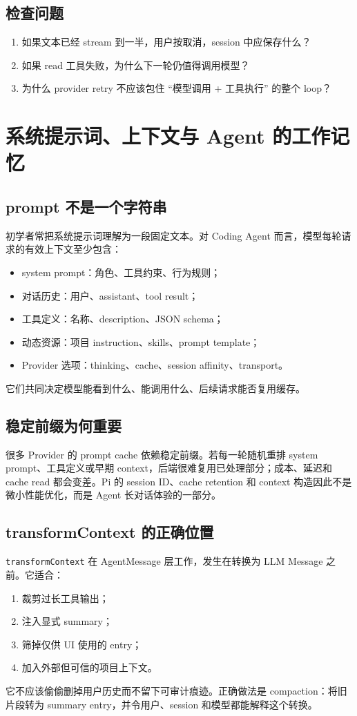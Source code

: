 \documentclass[UTF8,openany,11pt]{ctexbook}
\begin{document}
\section{检查问题}
\begin{enumerate}
\item 如果文本已经 stream 到一半，用户按取消，session 中应保存什么？
\item 如果 read 工具失败，为什么下一轮仍值得调用模型？
\item 为什么 provider retry 不应该包住 ``模型调用 + 工具执行'' 的整个 loop？
\end{enumerate}

\chapter{系统提示词、上下文与 Agent 的工作记忆}

\section{prompt 不是一个字符串}
初学者常把系统提示词理解为一段固定文本。对 Coding Agent 而言，模型每轮请求的有效上下文至少包含：
\begin{itemize}
\item system prompt：角色、工具约束、行为规则；
\item 对话历史：用户、assistant、tool result；
\item 工具定义：名称、description、JSON schema；
\item 动态资源：项目 instruction、skills、prompt template；
\item Provider 选项：thinking、cache、session affinity、transport。
\end{itemize}
它们共同决定模型能看到什么、能调用什么、后续请求能否复用缓存。

\section{稳定前缀为何重要}
很多 Provider 的 prompt cache 依赖稳定前缀。若每一轮随机重排 system prompt、工具定义或早期 context，后端很难复用已处理部分；成本、延迟和 cache read 都会变差。Pi 的 session ID、cache retention 和 context 构造因此不是微小性能优化，而是 Agent 长对话体验的一部分。

\section{transformContext 的正确位置}
\texttt{transformContext} 在 AgentMessage 层工作，发生在转换为 LLM Message 之前。它适合：
\begin{enumerate}
\item 裁剪过长工具输出；
\item 注入显式 summary；
\item 筛掉仅供 UI 使用的 entry；
\item 加入外部但可信的项目上下文。
\end{enumerate}
它不应该偷偷删掉用户历史而不留下可审计痕迹。正确做法是 compaction：将旧片段转为 summary entry，并令用户、session 和模型都能解释这个转换。
\end{document}
